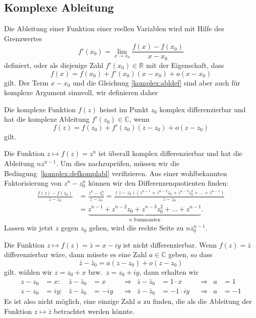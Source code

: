 %
%
\subsection{Komplexe Ableitung}
Die Ableitung einer Funktion einer reellen Variablen wird mit Hilfe des
Grenzwertes
\[
f'(x_0)=\lim_{x\to x_0}\frac{f(x)-f(x_0)}{x-x_0}
\]
definiert, oder als diejenige Zahl $f'(x_0)\in\mathbb R$ mit der Eigenschaft,
dass
\begin{equation}
f(x)=f(x_0)+f'(x_0)(x-x_0) + o(x-x_0)
\label{komplex:abldef}
\end{equation}
gilt.
Der Term $x-x_0$ und die Gleichung \eqref{komplex:abldef} sind aber auch
für komplexe Argument sinnvoll, wir definieren daher

\begin{definition}
\label{buch:funktionentheorie:definition:differenzierbar}
Die komplexe Funktion $f(z)$ heisst im Punkt $z_0$ komplex differenzierbar
und hat die komplexe Ableitung $f'(z_0)\in\mathbb C$, wenn
%
%
%
\begin{equation}
f(z)=f(z_0) + f'(z_0)(z-z_0) +o(z-z_0)
\label{komplex:defkomplabl}
\end{equation}
gilt.
\end{definition}

\begin{beispiel}
Die Funktion $z\mapsto f(z)=z^n$ ist überall komplex differenzierbar
und hat die Ableitung $nz^{n-1}$.
Um dies nachzuprüfen, müssen wir die Bedingung~\eqref{komplex:defkomplabl}
verifizieren.
Aus einer wohlbekannten Faktorisierung von $z^n - z_0^n$ können wir den
Differenzenquotienten finden:
\begin{align*}
\frac{f(z)-f(z_0)}{z-z_0}
&=
\frac{z^n-z_0^n}{z-z_0}
=
\frac{(z-z_0)(z^{n-1}+z^{n-2}z_0+z^{n-3}z_0^2+\dots+z^{n-1})}{z-z_0}
\\
&=
\underbrace{z^{n-1}+z^{n-2}z_0+z^{n-3}z_0^2+\dots+z^{n-1}
}_{\displaystyle \text{$n$ Summanden}}.
\end{align*}
Lassen wir jetzt $z$ gegen $z_0$ gehen, wird die rechte Seite
zu $nz_0^{n-1}$.
\end{beispiel}

\begin{beispiel}
Die Funktion $z\mapsto f(z)=\bar z=x-iy$ ist nicht differenzierbar.
Wenn $f(z)=\bar z$ differenzierbar wäre, dann müsste es eine Zahl
$a\in\mathbb C$ geben, so dass
\[
\bar z-\bar z_0=a(z-z_0)+o(z-z_0)
\]
gilt.
wählen wir $z=z_0+x$ bzw.~$z=z_0+iy$, dann erhalten wir
\[
\begin{aligned}
z-z_0&=x:&
\bar z-\bar z_0&=x
&&\Rightarrow&
\bar z-\bar z_0&=1\cdot x
&&\Rightarrow&
a&=1
\\
z-z_0&=iy:&
\bar z-\bar z_0&=-iy
&&\Rightarrow&
\bar z-\bar z_0&=-1\cdot iy
&&\Rightarrow&
a&=-1
\end{aligned}
\]
Es ist also nicht möglich, eine einzige Zahl $a$ zu finden, die als
die Ableitung der Funktion $z\mapsto \bar z$ betrachtet werden könnte.
\end{beispiel}


